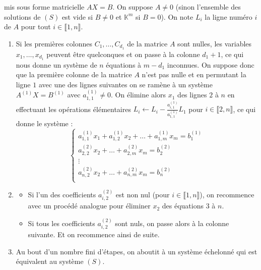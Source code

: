   mis sous forme matricielle $AX = B$. On suppose $A \neq 0$ (sinon l'ensemble des solutions de $(S)$ est vide si $B \neq 0$ et $\mathbb{K}^m$ si $B = 0$). On note $L_i$ la ligne numéro $i$ de $A$ pour tout $i \in \llbracket 1, n \rrbracket$.

  \begin{theorem}
    \begin{enumerate}[label={\bfseries(\roman*)}]
      \item Si les premières colonnes $C_1, \dots, C_{d_1}$ de la matrice $A$ sont nulles, les variables $x_1, \dots, x_{d_1}$ peuvent être quelconques et on passe à la colonne $d_1 + 1$, ce qui nous donne un système de $n$ équations à $m-d_1$ inconnues. On suppose donc que la première colonne de la matrice $A$ n'est pas nulle et en permutant la ligne $1$ avec une des lignes suivantes on se ramène à un système $A^{(1)}X = B^{(1)}$ avec $a_{1,1}^{(1)} \neq 0$. On élimine alors $x_1$ des lignes $2$ à $n$ en effectuant les opérations élémentaires $L_i \leftarrow L_i - \frac{a_{i,1}^{(1)}}{a_{1,1}^{(1)}} L_1$ pour $i \in \llbracket 2, n \rrbracket$, ce qui donne le système :
      \[
      \begin{cases}
        a_{1,1}^{(1)} x_1 + a_{1,2}^{(1)} x_2 + \dots + a_{1,m}^{(1)} x_m = b_1^{(1)} \\
        a_{2,2}^{(2)} x_2 + \dots + a_{2,m}^{(2)} x_m = b_2^{(2)} \\
        \vdots \\
        a_{n,2}^{(2)} x_2 + \dots + a_{n,m}^{(2)} x_m = b_n^{(2)} \\
      \end{cases}
      \]
      \item \begin{itemize}
        \item Si l'un  des coefficients $a_{i,2}^{(2)}$ est non nul (pour $i \in \llbracket 1, n \rrbracket$), on recommence avec un procédé analogue pour éliminer $x_2$ des équations $3$ à $n$.
        \item Si tous les coefficients $a_{i,2}^{(2)}$ sont nuls, on passe alors à la colonne suivante. Et on recommence ainsi de suite.
      \end{itemize}
      \item Au bout d'un nombre fini d'étapes, on aboutit à un système échelonné qui est équivalent au système $(S)$.
    \end{enumerate}
  \end{theorem}

